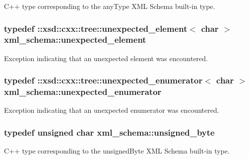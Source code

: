 C++ type corresponding to the any\+Type X\+M\+L Schema built-\/in type. 

\hypertarget{namespacexml__schema_a55835ab195e4c70bc05de5bbac871110}{}
\subsubsection[{unexpected\+\_\+element}]{\setlength{\rightskip}{0pt plus 5cm}typedef \+::xsd\+::cxx\+::tree\+::unexpected\+\_\+element$<$ char $>$ {\bf xml\+\_\+schema\+::unexpected\+\_\+element}}\label{namespacexml__schema_a55835ab195e4c70bc05de5bbac871110}


Exception indicating that an unexpected element was encountered. 

\hypertarget{namespacexml__schema_aa088274f605e06cd53d9062265b5229c}{}
\subsubsection[{unexpected\+\_\+enumerator}]{\setlength{\rightskip}{0pt plus 5cm}typedef \+::xsd\+::cxx\+::tree\+::unexpected\+\_\+enumerator$<$ char $>$ {\bf xml\+\_\+schema\+::unexpected\+\_\+enumerator}}\label{namespacexml__schema_aa088274f605e06cd53d9062265b5229c}


Exception indicating that an unexpected enumerator was encountered. 

\hypertarget{namespacexml__schema_a876b68656d976c6343512f3d44fe8ca2}{}
\subsubsection[{unsigned\+\_\+byte}]{\setlength{\rightskip}{0pt plus 5cm}typedef unsigned char {\bf xml\+\_\+schema\+::unsigned\+\_\+byte}}\label{namespacexml__schema_a876b68656d976c6343512f3d44fe8ca2}


C++ type corresponding to the unsigned\+Byte X\+M\+L Schema built-\/in type. 

\hypertarget{namespacexml__schema_a85ca3205d8af287e149aac54535f57e7}{}
